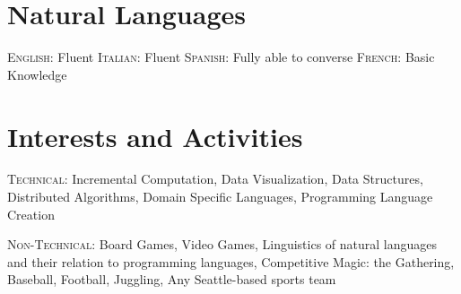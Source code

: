 \documentclass[letterpaper,10pt]{article} %
\begin{document}





\section{Natural Languages}

\textsc{English:} Fluent \hfill \textsc{Italian:} Fluent \hfill 
\textsc{Spanish:} Fully able to converse \hfill \textsc{French:} Basic Knowledge




\section{Interests and Activities}

\textsc{Technical:} Incremental Computation, Data Visualization, Data Structures, Distributed Algorithms, Domain Specific Languages, Programming Language Creation

\textsc{Non-Technical:} Board Games, Video Games, Linguistics of natural languages and their relation to programming languages, Competitive Magic: the Gathering, 
Baseball, Football, Juggling, Any Seattle-based sports team

\end{document}
